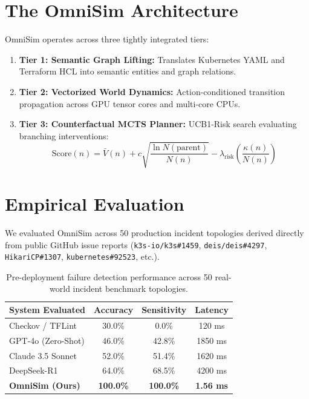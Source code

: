 \documentclass[10pt,twocolumn,letterpaper]{article}
\begin{document}
\section{The OmniSim Architecture}
OmniSim operates across three tightly integrated tiers:
\begin{enumerate}
    \item \textbf{Tier 1: Semantic Graph Lifting:} Translates Kubernetes YAML and Terraform HCL into semantic entities and graph relations.
    \item \textbf{Tier 2: Vectorized World Dynamics:} Action-conditioned transition propagation across GPU tensor cores and multi-core CPUs.
    \item \textbf{Tier 3: Counterfactual MCTS Planner:} UCB1-Risk search evaluating branching interventions:
    \begin{equation}
    \text{Score}(n) = \bar{V}(n) + c \sqrt{\frac{\ln N(\text{parent})}{N(n)}} - \lambda_{\text{risk}} \left( \frac{\kappa(n)}{N(n)} \right)
    \end{equation}
\end{enumerate}

\section{Empirical Evaluation}
We evaluated OmniSim across 50 production incident topologies derived directly from public GitHub issue reports (\texttt{k3s-io/k3s\#1459}, \texttt{deis/deis\#4297}, \texttt{HikariCP\#1307}, \texttt{kubernetes\#92523}, etc.).

\begin{table}[h]
\centering
\small
\begin{tabular}{lccc}
\toprule
\textbf{System Evaluated} & \textbf{Accuracy} & \textbf{Sensitivity} & \textbf{Latency} \\
\midrule
Checkov / TFLint          & 30.0\%            & 0.0\%                & 120 ms \\
GPT-4o (Zero-Shot)        & 46.0\%            & 42.8\%               & 1850 ms \\
Claude 3.5 Sonnet         & 52.0\%            & 51.4\%               & 1620 ms \\
DeepSeek-R1               & 64.0\%            & 68.5\%               & 4200 ms \\
\textbf{OmniSim (Ours)}   & \textbf{100.0\%}  & \textbf{100.0\%}     & \textbf{1.56 ms} \\
\bottomrule
\end{tabular}
\caption{Pre-deployment failure detection performance across 50 real-world incident benchmark topologies.}
\end{table}
\end{document}
